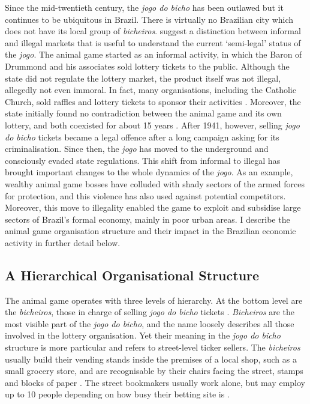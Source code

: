 \documentclass[a4paper,12pt]{article}
\begin{document}
Since the mid-twentieth century, the \textit{jogo do bicho} has been outlawed but it continues to be ubiquitous in Brazil. There is virtually no Brazilian city which does not have its local group of \textit{bicheiros}. \citet{cross2006risk} suggest a distinction between informal and illegal markets that is useful to understand the current `semi-legal' status of the \textit{jogo}. The animal game started as an informal activity, in which the Baron of Drummond and his associates sold lottery tickets to the public. Although the state did not regulate the lottery market, the product itself was not illegal, allegedly not even immoral. In fact, many organisations, including the Catholic Church, sold raffles and lottery tickets to sponsor their activities \citep[49]{torcato2011repressao}. Moreover, the state initially found no contradiction between the animal game and its own lottery, and both coexisted for about 15 years \citep[559]{chazkel2007beyond}. After 1941, however, selling \textit{jogo do bicho} tickets became a legal offence after a long campaign asking for its criminalisation. Since then, the \textit{jogo} has moved to the underground and consciously evaded state regulations. This shift from informal to illegal has brought important changes to the whole dynamics of the \textit{jogo}. As an example, wealthy animal game bosses have colluded with shady sectors of the armed forces for protection, and this violence has also used against potential competitors. Moreover, this move to illegality enabled the game to exploit and subsidise large sectors of Brazil's formal economy, mainly in poor urban areas. I describe the animal game organisation structure and their impact in the Brazilian economic activity in further detail below.  

\subsection{A Hierarchical Organisational Structure}%
\label{sub:organisation}

The animal game operates with three levels of hierarchy. At the bottom level are the \textit{bicheiros}, those in charge of selling \textit{jogo do bicho} tickets \citep{chazkel2007beyond, da1999aguias}. \textit{Bicheiros} are the most visible part of the \textit{jogo do bicho}, and the name loosely describes all those involved in the lottery organisation. Yet their meaning in the \textit{jogo do bicho} structure is more particular and refers to street-level ticker sellers. The \textit{bicheiros}  usually build their vending stands inside the premises of a local shop, such as a small grocery store, and are recognisable by their chairs facing the street, stamps and blocks of paper \citep[259]{chazkel2011laws}. The street bookmakers usually work alone, but may employ up to 10 people depending on how busy their betting site is \citep[69]{labronici2014sorteio}.
\end{document}
